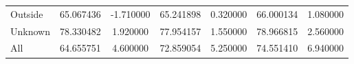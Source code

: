 \begin{table}[!ht]
\begin{tabular}{lSSSSSS@{}}
        \tabindent Outside          & 65.067436                                        & -1.710000                                             & 65.241898                                     & 0.320000  & 66.000134    & 1.080000  \\
        \tabindent Unknown          & 78.330482                                        & 1.920000                                              & 77.954157                                     & 1.550000  & 78.966815    & 2.560000  \\
        \cmidrule(rl){1-7}
  All              & 64.655751                                        & 4.600000                                              & 72.859054                                     & 5.250000  & 74.551410    & 6.940000  \\
        \bottomrule
    \end{tabular}
\end{table}

